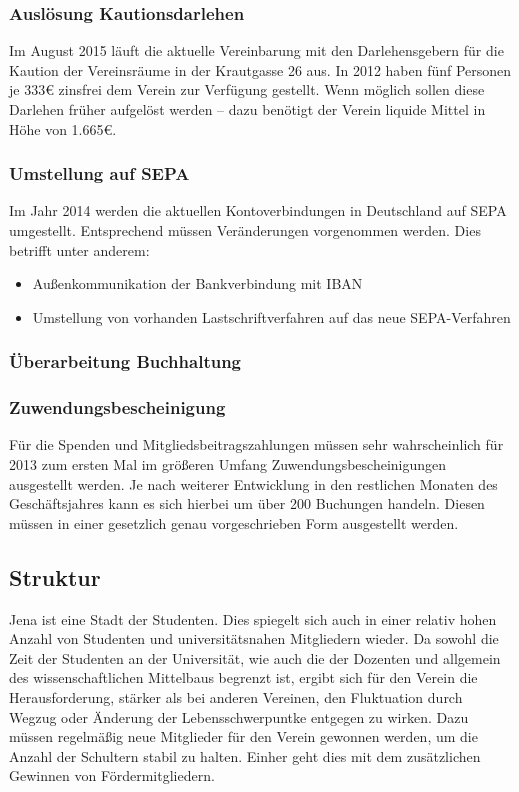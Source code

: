 \documentclass[10pt,DIV16]{scrartcl}
\begin{document}
\subsubsection{Auslösung Kautionsdarlehen}
\label{sec:katrionsdarlehen}

Im August 2015 läuft die aktuelle Vereinbarung mit den Darlehensgebern
für die Kaution der Vereinsräume in der Krautgasse 26 aus. In 2012
haben fünf Personen je 333\euro{} zinsfrei dem Verein zur Verfügung gestellt.
Wenn möglich sollen diese Darlehen früher aufgelöst werden -- dazu
benötigt der Verein liquide Mittel in Höhe von 1.665\euro{}.

\subsubsection{Umstellung auf SEPA}

Im Jahr 2014 werden die aktuellen Kontoverbindungen in Deutschland auf SEPA 
umgestellt. Entsprechend müssen Veränderungen vorgenommen werden. Dies 
betrifft unter anderem:

\begin{itemize}
	\item Außenkommunikation der Bankverbindung mit IBAN
	\item Umstellung von vorhanden Lastschriftverfahren auf das neue
		  SEPA-Verfahren
\end{itemize}

\subsubsection{Überarbeitung Buchhaltung}
\subsubsection{Zuwendungsbescheinigung}

Für die Spenden und Mitgliedsbeitragszahlungen müssen sehr
wahrscheinlich für 2013 zum ersten Mal im größeren Umfang
Zuwendungsbescheinigungen ausgestellt werden. Je nach weiterer
Entwicklung in den restlichen Monaten des Geschäftsjahres kann es sich
hierbei um über 200 Buchungen handeln. Diesen müssen in einer gesetzlich
genau vorgeschrieben Form ausgestellt werden.

\subsection{Struktur}

Jena ist eine Stadt der Studenten. Dies spiegelt sich auch in einer
relativ hohen Anzahl von Studenten und universitätsnahen Mitgliedern
wieder. Da sowohl die Zeit der Studenten an der Universität, wie auch
die der Dozenten und allgemein des wissenschaftlichen Mittelbaus
begrenzt ist, ergibt sich für den Verein die Herausforderung, stärker
als bei anderen Vereinen, den Fluktuation durch Wegzug oder
Änderung der Lebensschwerpuntke entgegen zu wirken. Dazu müssen
regelmäßig neue Mitglieder für den Verein gewonnen werden, um die
Anzahl der Schultern stabil zu halten. Einher geht dies mit dem
zusätzlichen Gewinnen von Fördermitgliedern.
\end{document}
